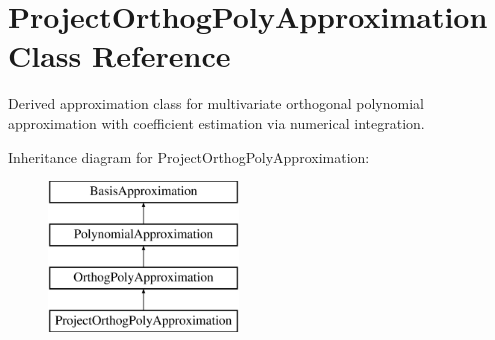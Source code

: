 \section{Project\+Orthog\+Poly\+Approximation Class Reference}
\label{classPecos_1_1ProjectOrthogPolyApproximation}


Derived approximation class for multivariate orthogonal polynomial approximation with coefficient estimation via numerical integration.  


Inheritance diagram for Project\+Orthog\+Poly\+Approximation\+:\begin{figure}[H]
\begin{center}
\leavevmode
\includegraphics[height=4.000000cm]{classPecos_1_1ProjectOrthogPolyApproximation}
\end{center}
\end{figure}
